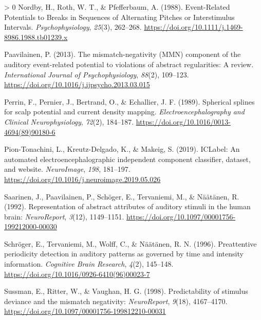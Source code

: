 \documentclass[twoside, man, a4paper,12pt, nofontenc]{apa7}
\newlength{\cslhangindent}
\newenvironment{CSLReferences}[3] %
 {%
  \setlength{\parindent}{0pt}
  \ifodd #1 \everypar{\setlength{\hangindent}{\cslhangindent}}\ignorespaces\fi
  \ifnum #2 > 0
  \setlength{\parskip}{#3\baselineskip}
  \fi
 }%
 {}
\begin{document}
\begin{CSLReferences}{1}{0}
\leavevmode\hypertarget{ref-nordbyEventRelatedPotentialsBreaks1988}{}%
Nordby, H., Roth, W. T., \& Pfefferbaum, A. (1988). Event-Related
Potentials to Breaks in Sequences of Alternating Pitches or
Interstimulus Intervals. \emph{Psychophysiology}, \emph{25}(3),
262--268. \url{https://doi.org/10.1111/j.1469-8986.1988.tb01239.x}

\leavevmode\hypertarget{ref-paavilainenMismatchnegativityMMNComponent2013}{}%
Paavilainen, P. (2013). The mismatch-negativity (MMN) component of the
auditory event-related potential to violations of abstract regularities:
A review. \emph{International Journal of Psychophysiology},
\emph{88}(2), 109--123.
\url{https://doi.org/10.1016/j.ijpsycho.2013.03.015}

\leavevmode\hypertarget{ref-perrinSphericalSplinesScalp1989}{}%
Perrin, F., Pernier, J., Bertrand, O., \& Echallier, J. F. (1989).
Spherical splines for scalp potential and current density mapping.
\emph{Electroencephalography and Clinical Neurophysiology},
\emph{72}(2), 184--187.
\url{https://doi.org/10.1016/0013-4694(89)90180-6}

\leavevmode\hypertarget{ref-pion-tonachiniICLabelAutomatedElectroencephalographic2019}{}%
Pion-Tonachini, L., Kreutz-Delgado, K., \& Makeig, S. (2019). ICLabel:
An automated electroencephalographic independent component classifier,
dataset, and website. \emph{NeuroImage}, \emph{198}, 181--197.
\url{https://doi.org/10.1016/j.neuroimage.2019.05.026}

\leavevmode\hypertarget{ref-saarinenRepresentationAbstractAttributes1992}{}%
Saarinen, J., Paavilainen, P., Schöger, E., Tervaniemi, M., \& Näätänen,
R. (1992). Representation of abstract attributes of auditory stimuli in
the human brain: \emph{NeuroReport}, \emph{3}(12), 1149--1151.
\url{https://doi.org/10.1097/00001756-199212000-00030}

\leavevmode\hypertarget{ref-schrogerPreattentivePeriodicityDetection1996}{}%
Schröger, E., Tervaniemi, M., Wolff, C., \& Näätänen, R. N. (1996).
Preattentive periodicity detection in auditory patterns as governed by
time and intensity information. \emph{Cognitive Brain Research},
\emph{4}(2), 145--148.
\url{https://doi.org/10.1016/0926-6410(96)00023-7}

\leavevmode\hypertarget{ref-sussmanPredictabilityStimulusDeviance1998}{}%
Sussman, E., Ritter, W., \& Vaughan, H. G. (1998). Predictability of
stimulus deviance and the mismatch negativity: \emph{NeuroReport},
\emph{9}(18), 4167--4170.
\url{https://doi.org/10.1097/00001756-199812210-00031}


\end{CSLReferences}
\end{document}
